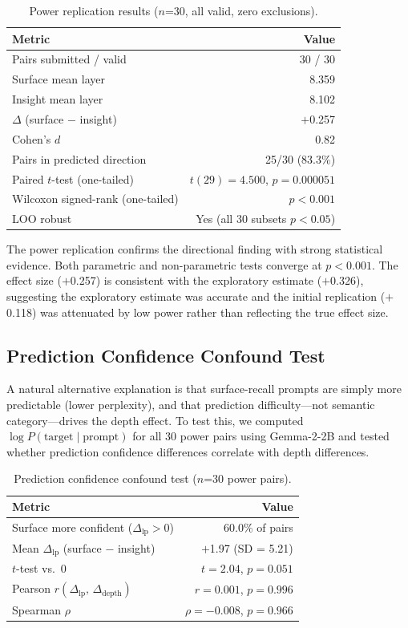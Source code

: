 \documentclass{article}
\begin{document}
\begin{table}[h]
\centering
\caption{Power replication results ($n$=30, all valid, zero exclusions).}
\label{tab:rep2}
\begin{tabular}{lr}
\toprule
Metric & Value \\
\midrule
Pairs submitted / valid & 30 / 30 \\
Surface mean layer & 8.359 \\
Insight mean layer & 8.102 \\
$\Delta$ (surface $-$ insight) & $+$0.257 \\
Cohen's $d$ & 0.82 \\
Pairs in predicted direction & 25/30 (83.3\%) \\
Paired $t$-test (one-tailed) & $t(29) = 4.500$, $p = 0.000051$ \\
Wilcoxon signed-rank (one-tailed) & $p < 0.001$ \\
LOO robust & Yes (all 30 subsets $p < 0.05$) \\
\bottomrule
\end{tabular}
\end{table}

The power replication confirms the directional finding with strong statistical evidence. Both 
parametric and non-parametric tests converge at $p < 0.001$. The effect size ($+$0.257) is 
consistent with the exploratory estimate ($+$0.326), suggesting the exploratory estimate was 
accurate and the initial replication ($+$0.118) was attenuated by low power rather than 
reflecting the true effect size.

\subsection{Prediction Confidence Confound Test}

A natural alternative explanation is that surface-recall prompts are simply more predictable 
(lower perplexity), and that prediction difficulty---not semantic category---drives the depth 
effect. To test this, we computed $\log P(\text{target} \mid \text{prompt})$ for all 30 power 
pairs using Gemma-2-2B and tested whether prediction confidence differences correlate with 
depth differences.

\begin{table}[h]
\centering
\caption{Prediction confidence confound test ($n$=30 power pairs).}
\label{tab:confound}
\begin{tabular}{lr}
\toprule
Metric & Value \\
\midrule
Surface more confident ($\Delta_\text{lp} > 0$) & 60.0\% of pairs \\
Mean $\Delta_\text{lp}$ (surface $-$ insight) & $+$1.97 (SD = 5.21) \\
$t$-test vs.\ 0 & $t = 2.04$, $p = 0.051$ \\
Pearson $r(\Delta_\text{lp},\, \Delta_\text{depth})$ & $r = 0.001$, $p = 0.996$ \\
Spearman $\rho$ & $\rho = -0.008$, $p = 0.966$ \\
\bottomrule
\end{tabular}
\end{table}
\end{document}
